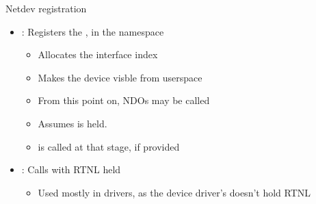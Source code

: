 \begin{frame}{Netdev registration}
	\begin{itemize}
		\item {} : Registers the , in the  namespace
			\begin{itemize}
				\item Allocates the interface index
				\item Makes the device visble from userspace
				\item From this point on, NDOs may be called
				\item Assumes  is held.
				\item {} is called at that stage, if provided
			\end{itemize}
		\item {} : Calls  with RTNL held
			\begin{itemize}
				\item Used mostly in drivers, as the device driver's  doesn't hold RTNL
			\end{itemize}
	\end{itemize}
\end{frame}

